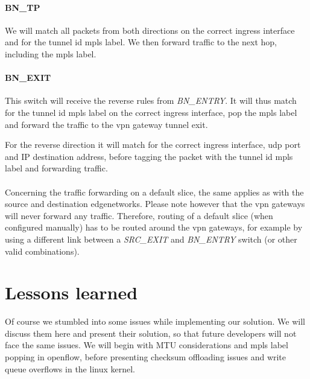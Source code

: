 \paragraph{BN\_TP} We will match all packets from both directions on the correct ingress interface and for the tunnel id \acrshort{mpls} label. We then forward traffic to the next hop, including the \acrshort{mpls} label.

\paragraph{BN\_EXIT} This switch will receive the reverse rules from \textit{BN\_ENTRY}. It will thus match for the tunnel id \acrshort{mpls} label on the correct ingress interface, pop the \acrshort{mpls} label and forward the traffic to the \acrshort{vpn} gateway tunnel exit.

For the reverse direction it will match for the correct ingress interface, \acrshort{udp} port and IP destination address, before tagging the packet with the tunnel id \acrshort{mpls} label and forwarding traffic.

\paragraph{} Concerning the traffic forwarding on a default slice, the same applies as with the source and destination \gls{edgenetwork}s. Please note however that the \acrshort{vpn} gateways will never forward any traffic. Therefore, routing of a default slice (when configured manually) has to be routed around the \acrshort{vpn} gateways, for example by using a different link between a \textit{SRC\_EXIT} and \textit{BN\_ENTRY} switch (or other valid combinations).


\section{Lessons learned}
Of course we stumbled into some issues while implementing our solution. We will discuss them here and present their solution, so that future developers will not face the same issues. We will begin with MTU considerations and \acrshort{mpls} label popping in \Gls{openflow}, before presenting checksum offloading issues and write queue overflows in the linux kernel.


